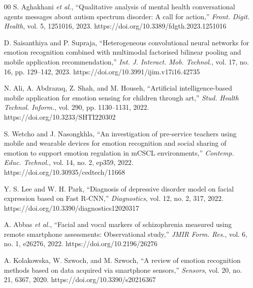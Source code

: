 \documentclass{ieeeaccess}
\begin{document}
\begin{thebibliography}{00}
		 S. Aghakhani \emph{et al.}, ``Qualitative analysis of mental health conversational agents messages about autism spectrum disorder: A call for action,'' \emph{Front. Digit. Health}, vol. 5, 1251016, 2023. https://doi.org/10.3389/fdgth.2023.1251016
		
		 D. Saisanthiya and P. Supraja, ``Heterogeneous convolutional neural networks for emotion recognition combined with multimodal factorised bilinear pooling and mobile application recommendation,'' \emph{Int. J. Interact. Mob. Technol.}, vol. 17, no. 16, pp. 129--142, 2023. https://doi.org/10.3991/ijim.v17i16.42735
		
		 N. Ali, A. Abdrazaq, Z. Shah, and M. Househ, ``Artificial intelligence-based mobile application for emotion sensing for children through art,'' \emph{Stud. Health Technol. Inform.}, vol. 290, pp. 1130--1131, 2022. https://doi.org/10.3233/SHTI220302
		
		 S. Wetcho and J. Nasongkhla, ``An investigation of pre-service teachers using mobile and wearable devices for emotion recognition and social sharing of emotion to support emotion regulation in mCSCL environments,'' \emph{Contemp. Educ. Technol.}, vol. 14, no. 2, ep359, 2022. https://doi.org/10.30935/cedtech/11668
		
		 Y. S. Lee and W. H. Park, ``Diagnosis of depressive disorder model on facial expression based on Fast R-CNN,'' \emph{Diagnostics}, vol. 12, no. 2, 317, 2022. https://doi.org/10.3390/diagnostics12020317
		
		 A. Abbas \emph{et al.}, ``Facial and vocal markers of schizophrenia measured using remote smartphone assessments: Observational study,'' \emph{JMIR Form. Res.}, vol. 6, no. 1, e26276, 2022. https://doi.org/10.2196/26276
		
		 A. Kolakowska, W. Szwoch, and M. Szwoch, ``A review of emotion recognition methods based on data acquired via smartphone sensors,'' \emph{Sensors}, vol. 20, no. 21, 6367, 2020. https://doi.org/10.3390/s20216367
	\end{thebibliography}
	
\end{document}
